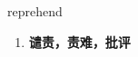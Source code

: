 
\begin{frame}
{\huge reprehend}
\begin{center}
\begin{enumerate}\Large
  \item \textbf{谴责，责难，批评}
\end{enumerate}
\end{center}
\end{frame}
